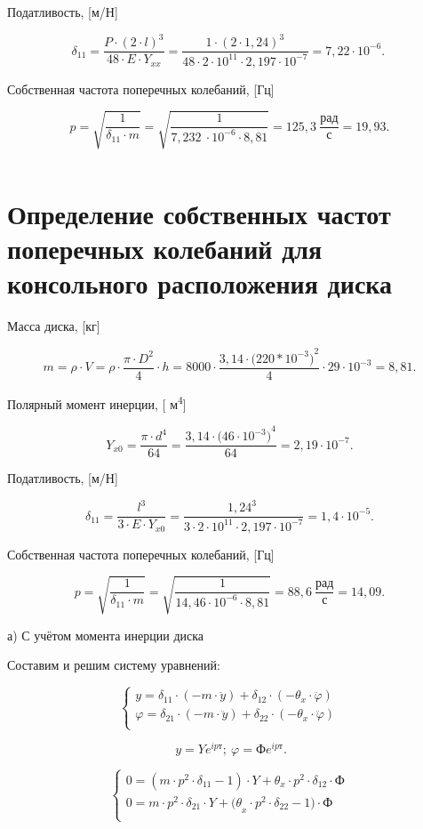 Податливость, [м/Н]

\[\delta_{11} = \frac{P\cdot {(2\cdot l)}^{3}}{48\cdot E\cdot Y_{\textit{xx}}} = \frac{1\cdot{(2\cdot1,24)}^{3}}{48\cdot2\cdot10^{11}\cdot2,197\cdot10^{- 7}} = 7,22\cdot10^{-6}.\ \ \]

Собственная частота поперечных колебаний, [Гц]

\[p = \sqrt{\frac{1}{\delta_{11}\cdot m}} = \sqrt{\frac{1}{7,232\ \cdot10^{- 6}\cdot8,81}} = 125,3\ \frac{рад}{с} = 19,93.\ \]

\[\]

\section{Определение собственных частот поперечных колебаний для консольного расположения диска}

Масса диска, [кг]

\[m = \rho\cdot V = \rho\cdot\frac{\pi\cdot D^{2}}{4}\cdot h = 8000\cdot\frac{3,14\cdot({220*10^{- 3})}^{2}}{4}\cdot29\cdot10^{- 3} = 8,81.\ \]

Полярный момент инерции, [ м\textsuperscript{4}]

\[Y_{x0} = \frac{\pi\cdot d^{4}}{64} = \frac{3,14\cdot({46\cdot10^{- 3})}^{4}}{64} = 2,19\cdot10^{-7}.\ \]

Податливость, [м/Н]

\[\delta_{11} = \frac{l^{3}}{3\cdot E\cdot Y_{x0}} = \frac{{1,24}^{3}\ }{3\cdot2\cdot10^{11}\cdot2,197\cdot10^{- 7}} = 1,4\cdot10^{-5}.\ \]

Собственная частота поперечных колебаний, [Гц]

\[p = \sqrt{\frac{1}{\delta_{11}\cdot m}} = \sqrt{\frac{1}{14,46\cdot10^{- 6}\cdot8,81}} = 88,6\ \frac{рад}{с} = 14,09.\ \]

а) С учётом момента инерции диска

Составим и решим систему уравнений:

\[\left\{ \begin{matrix}
y = \delta_{11}\cdot\left( - m\cdot\ddot{y} \right) + \delta_{12}\cdot( - \theta_{x}\cdot\ddot{\varphi}) \\
\varphi = \delta_{21}\cdot\left( - m\cdot\ddot{y} \right) + \delta_{22}\cdot( - \theta_{x}\cdot\ddot{\varphi}) \\
\end{matrix} \right.\ \]

\[y = Ye^{\textit{ipт}};\ \varphi = Фe^{\textit{ipт}}.\]

\[\left\{ 
\begin{matrix}
0 = \left( m\cdot p^{2}\cdot \delta_{11} - 1 \right)\cdot Y + \theta_{x}\cdot p^{2}\cdot\delta_{12}\cdot Ф \\
0 = m\cdot p^{2}\cdot \delta_{21}\cdot Y + {(\theta}_{x}\cdot p^{2}\cdot\delta_{22} - 1)\cdot Ф \\
\end{matrix} 
\right.\ \]

